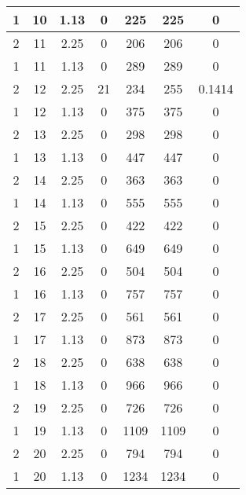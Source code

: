 \documentclass[letterpaper, 12pt]{article}
\begin{document}
\begin{longtable}{|c|c|c|c|c|c|c|}
1 & 10 & 1.13 & 0 & 225 & 225 & 0 \\
\hline
2 & 11 & 2.25 & 0 & 206 & 206 & 0 \\
\hline
1 & 11 & 1.13 & 0 & 289 & 289 & 0 \\
\hline
2 & 12 & 2.25 & 21 & 234 & 255 & 0.1414 \\
\hline
1 & 12 & 1.13 & 0 & 375 & 375 & 0 \\
\hline
2 & 13 & 2.25 & 0 & 298 & 298 & 0 \\
\hline
1 & 13 & 1.13 & 0 & 447 & 447 & 0 \\
\hline
2 & 14 & 2.25 & 0 & 363 & 363 & 0 \\
\hline
1 & 14 & 1.13 & 0 & 555 & 555 & 0 \\
\hline
2 & 15 & 2.25 & 0 & 422 & 422 & 0 \\
\hline
1 & 15 & 1.13 & 0 & 649 & 649 & 0 \\
\hline
2 & 16 & 2.25 & 0 & 504 & 504 & 0 \\
\hline
1 & 16 & 1.13 & 0 & 757 & 757 & 0 \\
\hline
2 & 17 & 2.25 & 0 & 561 & 561 & 0 \\
\hline
1 & 17 & 1.13 & 0 & 873 & 873 & 0 \\
\hline
2 & 18 & 2.25 & 0 & 638 & 638 & 0 \\
\hline
1 & 18 & 1.13 & 0 & 966 & 966 & 0 \\
\hline
2 & 19 & 2.25 & 0 & 726 & 726 & 0 \\
\hline
1 & 19 & 1.13 & 0 & 1109 & 1109 & 0 \\
\hline
2 & 20 & 2.25 & 0 & 794 & 794 & 0 \\
\hline
1 & 20 & 1.13 & 0 & 1234 & 1234 & 0 \\
\hline
\end{longtable}
\end{document}

